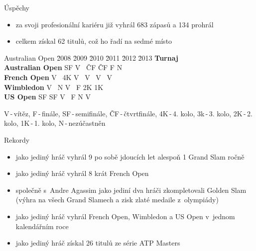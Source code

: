 \documentclass[pdf,slideColor,azure]{prosper}
\begin{document}
\begin{slide}{Úspěchy}
\begin{itemize}
\item za svoji profesionální kariéru již vyhrál 683 zápasů a 134 prohrál
\item celkem získal 62 titulů, což ho řadí na sedmé místo
\end{itemize}
\begin{table}[hc]
\begin{tabbing}
Australian Open \quad \= 2008 \= 2009 \= 2010 \= 2011 \= 2012 \= 2013  \kill
\textbf{Turnaj}       \\
\textbf{Australian Open} \> SF \> V~\> ČF \> ČF \> F \> N \\ 
\textbf{French Open} \> V~\> 4K \> V~\> V~\> V~\> V~\\ 
\textbf{Wimbledon} \> V~\> N \> V~\> F \> 2K \> 1K \\
\textbf{US Open} \> SF \> SF \> V~\> F \> N \> V~\\
\end{tabbing}
\end{table}
V\,-\,vítěz, F\,-\,finále, SF\,-\,semifinále, ČF\,-\,čtvrtfinále, 4K\,-\,4. kolo, 3k\,-\,3. kolo, 2K\,-\,2. kolo, 1K\,-\,1. kolo, N\,-\,nezúčastněn
\end{slide}

\begin{slide}{Rekordy}
\begin{itemize}
\item jako jediný hráč vyhrál 9 po sobě jdoucích let alespoň 1 Grand Slam ročně
\item jako jediný hráč vyhrál 8 krát French Open
\item společně s~Andre Agassim jako jediní dva hráči zkompletovali Golden Slam (výhra na všech Grand Slamech a zisk zlaté medaile z~olympiády)
\item jako jediný hráč vyhrál French Open, Wimbledon a US Open v~jednom kalendářním roce
\item jako jediný hráč získal 26 titulů ze série ATP Masters
\end{itemize}
\end{slide}
\end{document}
